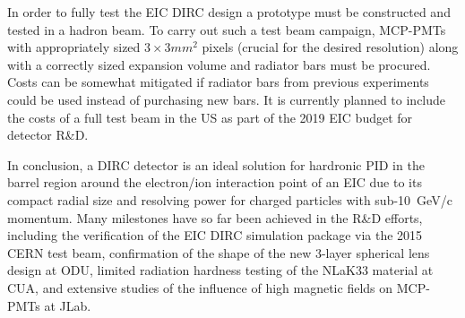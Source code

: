 In order to fully test the EIC DIRC design a prototype must be constructed and tested in a hadron beam. To carry out such a test beam campaign, MCP-PMTs with appropriately sized $3\times3\unit{mm}^2$ pixels (crucial for the desired resolution) along with a correctly sized expansion volume and radiator bars must be procured. Costs can be somewhat mitigated if radiator bars from previous experiments could be used instead of purchasing new bars. It is currently planned to include the costs of a full test beam in the US as part of the 2019 EIC budget for detector R\&D.

In conclusion, a DIRC detector is an ideal solution for hardronic PID in the barrel region around the electron/ion interaction point of an EIC due to its compact radial size and resolving power for charged particles with sub-10~GeV/c momentum. Many milestones have so far been achieved in the R\&D efforts, including the verification of the EIC DIRC simulation package via the 2015 CERN test beam, confirmation of the shape of the new 3-layer spherical lens design at ODU, limited radiation hardness testing of the NLaK33 material at CUA, and extensive studies of the influence of high magnetic fields on MCP-PMTs at JLab. 